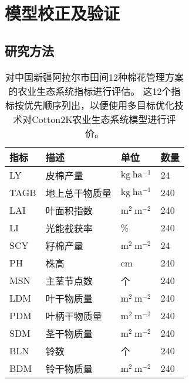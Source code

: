 \chapter{模型校正及验证}\label{chap:moo}

\section{研究方法}
\begin{table}
    \caption{对中国新疆阿拉尔市田间12种棉花管理方案的农业生态系统指标进行评估。
        这12个指标按优先顺序列出，以便使用多目标优化技术对Cotton2K农业生态系统模型进行评价。}
    \centering
    \begin{tabular}{llll}
        \toprule
        指标 & 描述           & 单位                   & 数量 \\
        \midrule
        LY   & 皮棉产量       & $\mathrm{kg\ ha^{-1}}$ & 24   \\
        TAGB & 地上总干物质量 & $\mathrm{kg\ ha^{-1}}$ & 240  \\
        LAI  & 叶面积指数     & $\mathrm{m^2\ m^{-2}}$ & 240  \\
        LI   & 光能截获率     & \%                     & 240  \\
        SCY  & 籽棉产量       & $\mathrm{m^2\ m^{-2}}$ & 24   \\
        PH   & 株高           & cm                     & 240  \\
        MSN  & 主茎节点数     & 个                     & 240  \\
        LDM  & 叶干物质量     & $\mathrm{m^2\ m^{-2}}$ & 240  \\
        PDM  & 叶柄干物质量   & $\mathrm{m^2\ m^{-2}}$ & 240  \\
        SDM  & 茎干物质量     & $\mathrm{m^2\ m^{-2}}$ & 240  \\
        BLN  & 铃数           & 个                     & 240  \\
        BDM  & 铃干物质量     & $\mathrm{m^2\ m^{-2}}$ & 240  \\
        \bottomrule
    \end{tabular}
\end{table}

